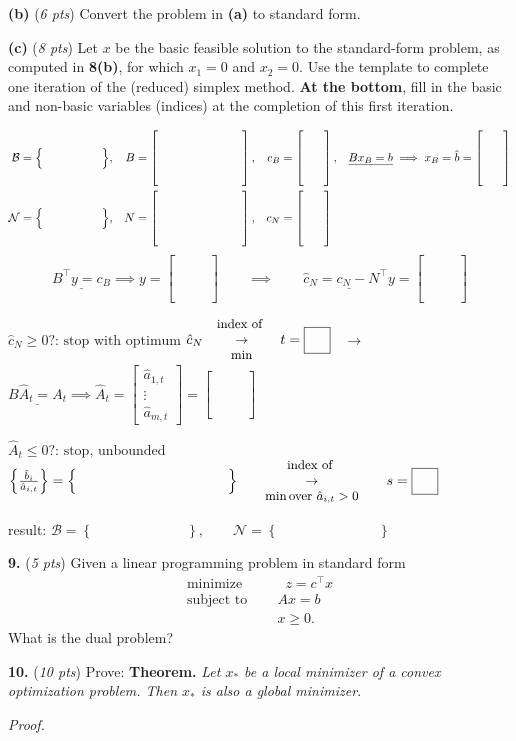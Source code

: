 \documentclass[11pt]{amsart}
\newcommand{\prob}[1]{\bigskip\noindent\textbf{#1.} }
\newcommand{\pts}[1]{(\emph{#1 pts})}
\newcommand{\probpts}[2]{\prob{#1} \pts{#2}}
\newcommand{\epartpts}[2]{\medskip\noindent \textbf{(#1)} \pts{#2}}
\newcommand{\blankset}{\Big\{\hspace{0.7in}\Big\}}
\newcommand{\blankmatrix}{\begin{bmatrix} \hspace{1.0in} \\ \hspace{1.0in} \\ \hspace{1.0in} \\ \hspace{1.0in} \end{bmatrix}}
\newcommand{\blankcolumn}{\begin{bmatrix} \phantom{mm} \\ \phantom{m} \\ \phantom{m} \\ \phantom{m} \end{bmatrix}}
\newcommand{\boxint}{\boxed{\phantom{m\big|}}}
\newcommand{\longblankset}{\Big\{\hspace{1.5in}\Big\}}
\newcommand{\stacksarrow}[2]{\quad {\small \begin{matrix} #1 \\ \to \\ #2 \end{matrix}} \quad}
\newcommand{\lpstep}{%
\noindent\hrulefill
\small
\begin{align*}
\mathcal{B} &= \blankset, & B &= \blankmatrix, & c_B &= \blankcolumn, & \underline{B x_B = b} \implies x_B = \hat b &= \blankcolumn \\
\mathcal{N} &= \blankset, & N &= \blankmatrix, & c_N &= \blankcolumn
\end{align*}
$$\underline{B^\top y = c_B} \implies y = \blankcolumn \qquad \implies \qquad \underline{\hat c_N = c_N - N^\top y} = \blankcolumn$$

\noindent $\boxed{\hat c_N \ge 0 \text{?: stop with optimum}}$ \quad $\hat c_N \stacksarrow{\text{index of }}{\min} t = \boxint$ \, $\to$ \, $\underline{B \hat A_t = A_t} \implies \hat A_t = \begin{bmatrix} \hat a_{1,t} \\ \vdots \\ \hat a_{m,t} \end{bmatrix} = \blankcolumn$

\medskip
\noindent $\boxed{\hat A_t \le 0 \text{?: stop, unbounded}}$ \quad $\Big\{\frac{\hat b_i}{\hat a_{i,t}}\Big\} = \longblankset \quad \stacksarrow{\text{index of }}{\min \text{over } \hat a_{i,t}>0} \quad s = \boxint$}
\begin{document}
\epartpts{b}{6}  Convert the problem in \textbf{(a)} to standard form.
\vfill

\clearpage\newpage
\epartpts{c}{8}  Let $x$ be the basic feasible solution to the standard-form problem, as computed in \textbf{8(b)}, for which $x_1=0$ and $x_2=0$.  Use the template to complete one iteration of the (reduced) simplex method.  \textbf{At the bottom}, fill in the basic and non-basic variables (indices) at the completion of this first iteration.

\bigskip

\lpstep

\hrulefill

\vspace{1.0in}
\normalsize
\noindent  result: \hspace{0.5in} $\displaystyle \mathcal{B} = \left\{\phantom{\big| adlsadf a adkjf}\right\}, \qquad \mathcal{N} = \left\{\phantom{\big| ada da fdsdf lkjf}\right\}$


\clearpage\newpage
\probpts{9}{5}  Given a linear programming problem in standard form
    $$\begin{matrix}
    \text{minimize}\phantom{xxx} & \phantom{x} z = c^\top x \\
    \text{subject to}\phantom{xx} & A x = b \\
                      & x \ge 0.
    \end{matrix}$$
What is the dual problem?
\vspace{2.2in}

\probpts{10}{10}  Prove:  \qquad
\textbf{Theorem.}  \emph{Let $x_*$ be a local minimizer of a convex optimization problem.  Then $x_*$ is also a global minimizer.}

\medskip
\noindent \emph{Proof.}
\vfill


\end{document}
